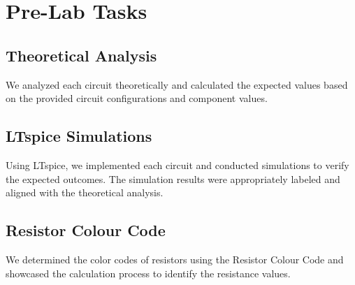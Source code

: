 \chapter{Pre-Lab Tasks}

\section{Theoretical Analysis}
We analyzed each circuit theoretically and calculated the expected values based on the provided circuit configurations and component values.

\section{LTspice Simulations}
Using LTspice, we implemented each circuit and conducted simulations to verify the expected outcomes. The simulation results were appropriately labeled and aligned with the theoretical analysis.

\section{Resistor Colour Code}
We determined the color codes of resistors using the Resistor Colour Code and showcased the calculation process to identify the resistance values.
